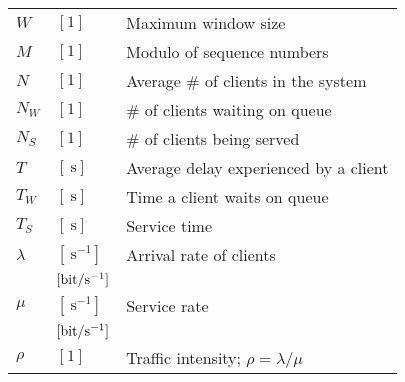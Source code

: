 \documentclass{form}
\begin{document}
\begin{center}
\begin{minipage}{0.49\textwidth}
\begin{tabular}{l l | p{59mm}}
            $W$           & $[1                       ]$ & Maximum window size                                         \\
            $M$           & $[1                       ]$ & Modulo of sequence numbers                                  \\
            $N$           & $[1                       ]$ & Average \# of clients in the system                         \\
            $N_W$         & $[1                       ]$ & \# of clients waiting on queue                              \\
            $N_S$         & $[1                       ]$ & \# of clients being served                                  \\
            $T$           & $[\SI{}{\second}          ]$ & Average delay experienced by a client                       \\
            $T_W$         & $[\SI{}{\second}          ]$ & Time a client waits on queue                                \\
            $T_S$         & $[\SI{}{\second}          ]$ & Service time                                                \\
            $\lambda$     & $[\SI{}{     \second^{-1}}]$ & Arrival rate of clients                                     \\
                          & $[\SI{}{\bit/\second^{-1}}]$ &                                                             \\
            $\mu$         & $[\SI{}{     \second^{-1}}]$ & Service rate                                                \\
                          & $[\SI{}{\bit/\second^{-1}}]$ &                                                             \\
            $\rho$        & $[1                       ]$ & Traffic intensity; $\rho = \lambda/\mu$                     \\
        \end{tabular}
    \end{minipage}
\end{center}
\end{document}
